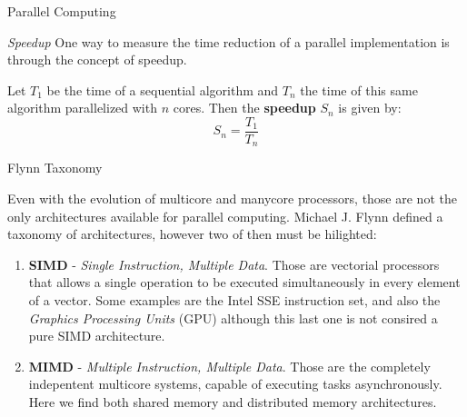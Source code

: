 \begin{section}{Parallel Computing}
\begin{subsection}{\textit{Speedup}}
	One way to measure the time reduction of a parallel implementation
	is through the concept of speedup. 

\begin{definition}
	Let $T_1$ be the time of a sequential algorithm and $T_n$ the time
	of this same algorithm parallelized with $n$ cores. Then the
	\textbf{speedup} $S_n$ is given by:
    $$ S_n = \frac{T_1}{T_n} $$
\end{definition}


\end{subsection}


\begin{subsection}{Flynn Taxonomy}


Even with the evolution of multicore and manycore processors,
those are not the only architectures available for parallel computing.
Michael J. Flynn \citep{pacheco:2011} defined a taxonomy of architectures,
however two of then must be hilighted:
\begin{enumerate}
    \item \textbf{SIMD} - \textit{Single Instruction, Multiple Data}. Those
	are vectorial processors that allows a single operation to be executed
	simultaneously in every element of a vector. Some examples are the
	Intel SSE instruction set, and also the \textit{Graphics Processing Units} (GPU)
	although this last one is not consired a pure SIMD architecture.

    \item \textbf{MIMD} - \textit{Multiple Instruction, Multiple Data}. Those
	are the completely indepentent multicore systems, capable of
	executing tasks asynchronously. Here we find both shared memory and distributed
	memory architectures.

\end{enumerate}
\end{subsection}


\end{section}
